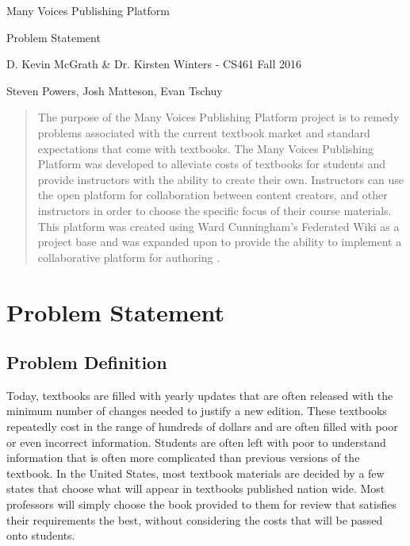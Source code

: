 \documentclass[letterpaper, 10pt, draftclsnofoot, onecolumn, compsoc]{IEEEtran}
\begin{document}
\begin{titlepage}
\centering
{\huge Many Voices Publishing Platform\par}
{\LARGE Problem Statement\par}
{\vspace{2mm}}
{\large D. Kevin McGrath \& Dr. Kirsten Winters -  CS461 Fall 2016\par}
{\large Steven Powers, Josh Matteson, Evan Tschuy\par}
{\vspace{10mm}}

\begin{abstract}\noindent The purpose of the Many Voices Publishing Platform 
project is to remedy problems associated with the current textbook market 
and standard expectations that come with textbooks. 
The Many Voices Publishing Platform was developed to alleviate 
costs of textbooks for students and provide instructors with the ability 
to create their own. Instructors can use the open platform for 
collaboration between content creators, and other instructors in order 
to choose the specific focus of their course materials. 
This platform was created using Ward Cunningham's Federated 
Wiki as a project base and was expanded upon to provide 
the ability to implement a collaborative platform for authoring \cite{Federated}.
\end{abstract}

\end{titlepage}

\tableofcontents

\newpage

\setcounter{page}{1}\pagestyle{fancy}

\vspace{1pc}
\section{Problem Statement}

\vspace{1pc}
\subsection{Problem Definition}
\vspace{1pc}

{\noindent Today, textbooks are filled with yearly updates that 
are often released with the minimum number of changes needed to 
justify a new edition. These textbooks repeatedly cost in the range of 
hundreds of dollars and are often filled with poor or even incorrect 
information. 
Students are often left with poor to understand information that is often more
complicated than previous versions of the textbook.
In the United States, most textbook materials are decided by a few 
states that choose what will appear in textbooks published nation wide. 
Most professors will simply choose the book provided to them for 
review that satisfies their requirements the best, without considering 
the costs that will be passed onto students. \par}
\end{document}
